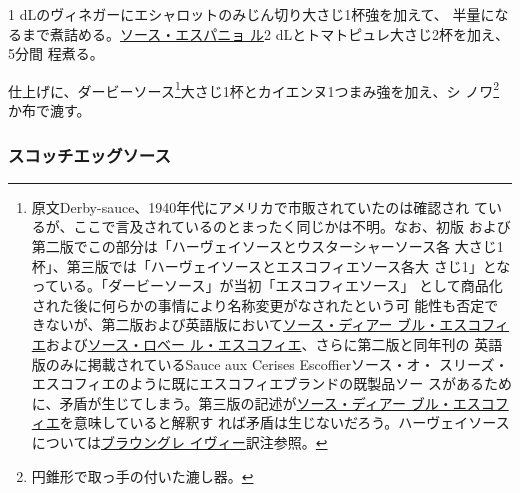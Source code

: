 \begin{recette}
1\undemi{} dLのヴィネガーにエシャロットのみじん切り大さじ1杯強を加えて、
半量になるまで煮詰める。\protect\hyperlink{sauce-espagnole}{ソース・エスパニョ
ル}2\undemi{} dLとトマトピュレ大さじ2杯を加え、5分間 程煮る。

仕上げに、ダービーソース\footnote{原文Derby-sauce、1940年代にアメリカで市販されていたのは確認され
  ているが、ここで言及されているのとまったく同じかは不明。なお、初版
  および第二版でこの部分は「ハーヴェイソースとウスターシャーソース各
  大さじ1杯」、第三版では「ハーヴェイソースとエスコフィエソース各大
  さじ1」となっている。「ダービーソース」が当初「エスコフィエソース」
  として商品化された後に何らかの事情により名称変更がなされたという可
  能性も否定できないが、第二版および英語版において\protect\hyperlink{sauce-diable-escoffier}{ソース・ディアー
  ブル・エスコフィエ}および\protect\hyperlink{sauce-robert-escoffier}{ソース・ロベー
  ル・エスコフィエ}、さらに第二版と同年刊の
  英語版のみに掲載されているSauce aux Cerises Escoffierソース・オ・
  スリーズ・エスコフィエのように既にエスコフィエブランドの既製品ソー
  スがあるために、矛盾が生じてしまう。第三版の記述が\protect\hyperlink{sauce-diable-escoffier}{ソース・ディアー
  ブル・エスコフィエ}を意味していると解釈す
  れば矛盾は生じないだろう。ハーヴェイソースについては\protect\hyperlink{brown-gravy}{ブラウングレ
  イヴィー}訳注参照。}大さじ1杯とカイエンヌ1つまみ強を加え、シ
ノワ\footnote{円錐形で取っ手の付いた漉し器。}か布で漉す。

\maeaki

\hypertarget{scotch-eggs-sauce}{%
\subsubsection{スコッチエッグソース}\label{scotch-eggs-sauce}}




\end{recette}
